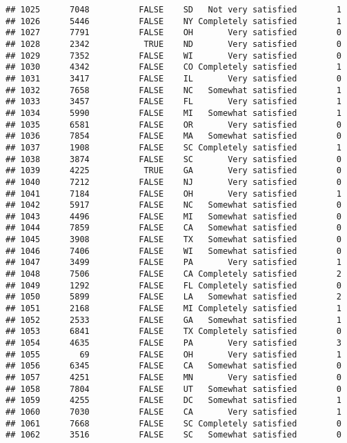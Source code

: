 \documentclass[]{book}
\theoremstyle{definition}
\theoremstyle{definition}
\theoremstyle{remark}
\begin{document}
\begin{verbatim}
## 1025      7048          FALSE    SD   Not very satisfied        1
## 1026      5446          FALSE    NY Completely satisfied        1
## 1027      7791          FALSE    OH       Very satisfied        0
## 1028      2342           TRUE    ND       Very satisfied        0
## 1029      7352          FALSE    WI       Very satisfied        0
## 1030      4342          FALSE    CO Completely satisfied        1
## 1031      3417          FALSE    IL       Very satisfied        0
## 1032      7658          FALSE    NC   Somewhat satisfied        1
## 1033      3457          FALSE    FL       Very satisfied        1
## 1034      5990          FALSE    MI   Somewhat satisfied        1
## 1035      6581          FALSE    OR       Very satisfied        0
## 1036      7854          FALSE    MA   Somewhat satisfied        0
## 1037      1908          FALSE    SC Completely satisfied        1
## 1038      3874          FALSE    SC       Very satisfied        0
## 1039      4225           TRUE    GA       Very satisfied        0
## 1040      7212          FALSE    NJ       Very satisfied        0
## 1041      7184          FALSE    OH       Very satisfied        1
## 1042      5917          FALSE    NC   Somewhat satisfied        0
## 1043      4496          FALSE    MI   Somewhat satisfied        0
## 1044      7859          FALSE    CA   Somewhat satisfied        0
## 1045      3908          FALSE    TX   Somewhat satisfied        0
## 1046      7406          FALSE    WI   Somewhat satisfied        0
## 1047      3499          FALSE    PA       Very satisfied        1
## 1048      7506          FALSE    CA Completely satisfied        2
## 1049      1292          FALSE    FL Completely satisfied        0
## 1050      5899          FALSE    LA   Somewhat satisfied        2
## 1051      2168          FALSE    MI Completely satisfied        1
## 1052      2533          FALSE    GA   Somewhat satisfied        1
## 1053      6841          FALSE    TX Completely satisfied        0
## 1054      4635          FALSE    PA       Very satisfied        3
## 1055        69          FALSE    OH       Very satisfied        1
## 1056      6345          FALSE    CA   Somewhat satisfied        0
## 1057      4251          FALSE    MN       Very satisfied        0
## 1058      7804          FALSE    UT   Somewhat satisfied        0
## 1059      4255          FALSE    DC   Somewhat satisfied        1
## 1060      7030          FALSE    CA       Very satisfied        1
## 1061      7668          FALSE    SC Completely satisfied        0
## 1062      3516          FALSE    SC   Somewhat satisfied        0

\end{verbatim}
\end{document}
